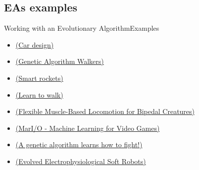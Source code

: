 \documentclass[10pt,compress]{beamer} %
\begin{document}
\subsection{EAs examples}
\begin{frame}{Working with an Evolutionary Algorithm}{Examples}
	\begin{itemize}
		\item \href{http://rednuht.org/genetic\_cars\_2/} {(Car design)}
		\item \href{http://rednuht.org/genetic\_walkers/} {(Genetic Algorithm Walkers)}
		\item \href{http://www.blprnt.com/smartrockets/}{(Smart rockets)}
		\item \href{https://www.youtube.com/watch?v=xcIBoPuNIiw}{(Learn to walk)}
		\item \href{https://www.youtube.com/watch?v=pgaEE27nsQw}{(Flexible Muscle-Based Locomotion for Bipedal Creatures)}
		\item \href{https://www.youtube.com/watch?v=qv6UVOQ0F44}{(MarI/O - Machine Learning for Video Games)}
		\item \href{https://www.youtube.com/watch?v=u2t77mQmJiY}{(A genetic algorithm learns how to fight!)}
		\item \href{https://www.youtube.com/watch?v=HgWQ-gPIvt4}{(Evolved Electrophysiological Soft Robots)}
	\end{itemize}
\end{frame}
\end{document}
